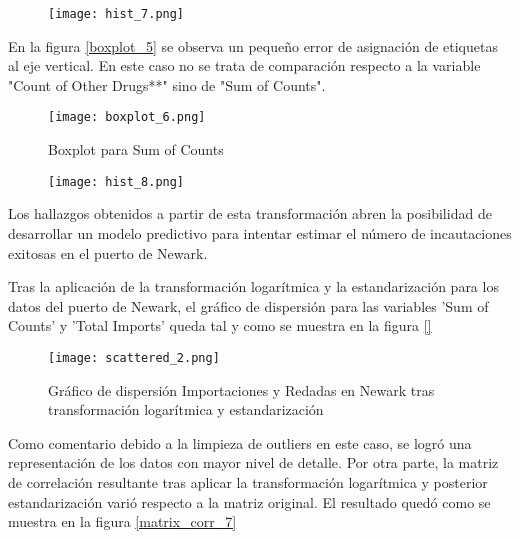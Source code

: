 \documentclass[12pt]{article}
\begin{document}
		\begin{figure}[H]
			\caption{\label{hist_7} }
			\centering
			\hspace*{1cm}
			\texttt{[image: hist\_7.png]}
		\end{figure}
		
		En la figura \ref{boxplot_5} se observa un pequeño error de asignación de etiquetas al eje vertical. En este caso no se trata de comparación respecto a la variable "Count of  Other Drugs**" sino de "Sum of Counts".
		
		
		
		\begin{figure}[H]
			\caption{\label{boxplot_6} Boxplot para Sum of Counts}
			\centering
			\hspace*{1cm}
			\texttt{[image: boxplot\_6.png]}
		\end{figure}
		
		\begin{figure}[H]
			\caption{\label{hist_8} }
			\centering
			\hspace*{1cm}
			\texttt{[image: hist\_8.png]}
		\end{figure}
		
		Los hallazgos obtenidos a partir de esta transformación abren la posibilidad de desarrollar un modelo predictivo para intentar estimar el número de incautaciones exitosas en el puerto de Newark.
		
		Tras la aplicación de la transformación logarítmica y la estandarización para los datos del puerto de Newark, el gráfico de dispersión para las variables 'Sum of Counts' y 'Total Imports' queda tal y como se muestra en la figura \ref{}
		
		\begin{figure}[H]
			\caption{\label{scattered_2} Gráfico de dispersión Importaciones y Redadas en Newark tras transformación logarítmica y estandarización }
			\centering
			\hspace*{1cm}
			\texttt{[image: scattered\_2.png]}
		\end{figure}
	
		Como comentario debido a la limpieza de outliers en este caso, se logró una representación de los datos con mayor nivel de detalle. Por otra parte, la matriz de correlación resultante tras aplicar la transformación logarítmica y posterior estandarización varió respecto a la matriz original. El resultado quedó como se muestra en la figura \ref{matrix_corr_7}
		
\end{document}

